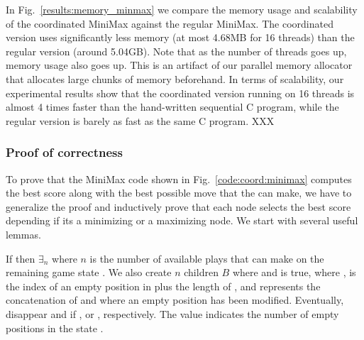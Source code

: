 In Fig.~\ref{results:memory_minmax} we compare the memory usage and scalability
of the coordinated MiniMax against the regular MiniMax. The coordinated version
uses significantly less memory (at most 4.68MB for 16 threads) than the regular
version (around 5.04GB). Note that as the number of threads goes up, memory
usage also goes up. This is an artifact of our parallel memory allocator that
allocates large chunks of memory beforehand. In terms of scalability, our
experimental results show that the coordinated version running on 16 threads is
almost 4 times faster than the hand-written sequential C program, while the
regular version is barely as fast as the same C program. XXX

\subsubsection{Proof of correctness}

To prove that the MiniMax code shown in Fig.~\ref{code:coord:minimax} computes
the best score along with the best possible move that the  can
make, we have to generalize the proof and inductively prove that each node
selects the best score depending if its a minimizing or a maximizing node. We
start with several useful lemmas.

\begin{lemma}

If  then $\exists_n$ where $n$ is the number of available plays that
 can make on the remaining game state .  We also
create $n$ children $B$ where  and  is true, where ,  is the index of an empty position in
 plus the length of , and  represents
the concatenation of  and  where an empty
position has been modified. Eventually,  disappear and if
,  or ,
respectively. The value  indicates the number of empty positions in
the state .

\end{lemma}

